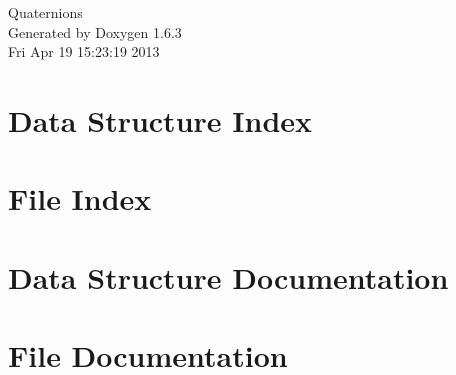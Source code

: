 \documentclass[a4paper]{book}
\begin{document}
\hypersetup{pageanchor=false}
\begin{titlepage}
\vspace*{7cm}
\begin{center}
{\Large Quaternions }\\
\vspace*{1cm}
{\large Generated by Doxygen 1.6.3}\\
\vspace*{0.5cm}
{\small Fri Apr 19 15:23:19 2013}\\
\end{center}
\end{titlepage}
\clearemptydoublepage
{}
\tableofcontents
\clearemptydoublepage
{}
\hypersetup{pageanchor=true}
\chapter{Data Structure Index}

\chapter{File Index}

\chapter{Data Structure Documentation}

\chapter{File Documentation}















\printindex
\end{document}
